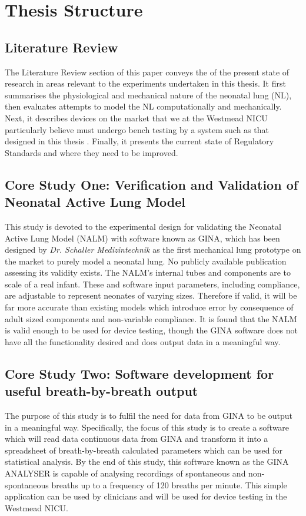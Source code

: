 \documentclass[12pt, openany, oneside]{book}
\begin{document}
\section{Thesis Structure}


\subsection{Literature Review}
The Literature Review section of this paper conveys the of the present state of research in areas relevant to the experiments undertaken in this thesis. It first summarises the physiological and mechanical nature of the neonatal lung (NL), then evaluates attempts to model the NL computationally and mechanically. Next, it describes devices on the market that we at the Westmead NICU particularly believe must undergo bench testing by a system such as that designed in this thesis . Finally, it presents the current state of Regulatory Standards and where they need to be improved.

\subsection{Core Study One: Verification and Validation of Neonatal Active Lung Model}
This study is devoted to the experimental design for validating the Neonatal Active Lung Model (NALM) with software known as GINA, which has been designed by \textit{Dr. Schaller Medizintechnik} \texttrademark  as the first mechanical lung prototype on the market to purely model a neonatal lung. No publicly available publication assessing its validity exists. The NALM's internal tubes and components are to scale of a real infant. These and software input parameters, including compliance, are adjustable to represent neonates of varying sizes. Therefore if valid, it will be far more accurate than existing models which introduce error by consequence of adult sized components and non-variable compliance. It is found that the NALM is valid enough to be used for device testing, though the GINA software does not have all the functionality desired and does output data in a meaningful way.


\subsection{Core Study Two: Software development for useful breath-by-breath output}
The purpose of this study is to fulfil the need for data from GINA to be output in a meaningful way. Specifically, the focus of this study is to create a software  which will read data continuous data from GINA and transform it into a spreadsheet of breath-by-breath calculated parameters which can be used for statistical analysis. By the end of this study, this software known as the GINA ANALYSER is capable of analysing recordings of spontaneous and non-spontaneous breaths up to a frequency of 120 breaths per minute. This simple application can be used by clinicians and will be used for device testing in the Westmead NICU.
\end{document}
